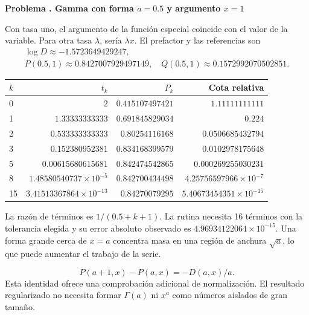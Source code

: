 \documentclass[11pt,a4paper]{article}
\theoremstyle{definition}
\newcounter{problema}
\newenvironment{resuelto}[1]{\refstepcounter{problema}\par\medskip\Needspace{6\baselineskip}\textbf{Problema \theproblema. #1}\par}{\par\medskip}
\begin{document}
\begin{resuelto}{Gamma con forma $a=0.5$ y argumento $x=1$}
Con tasa uno, el argumento de la función especial coincide con el valor de la variable. Para otra tasa $\lambda$, sería $\lambda x$. El prefactor y las referencias son
\[
\begin{gathered}
\log D\approx-1.5723649429247,\\
P(0.5,1)\approx0.8427007929497149,\quad Q(0.5,1)\approx0.1572992070502851.
\end{gathered}
\]

\begin{center}\small\begin{tabular}{lrrr}
\toprule
$k$ & $t_k$ & $P_k$ & Cota relativa\\\midrule
0 & $2$ & $0.415107497421$ & $1.11111111111$\\
1 & $1.33333333333$ & $0.691845829034$ & $0.224$\\
2 & $0.533333333333$ & $0.80254116168$ & $0.0506685432794$\\
3 & $0.152380952381$ & $0.834168399579$ & $0.0102978175648$\\
5 & $0.00615680615681$ & $0.842474542865$ & $0.000269255030231$\\
8 & $1.48580540737\times10^{-5}$ & $0.842700434498$ & $4.25756597966\times10^{-7}$\\
15 & $3.41513367864\times10^{-13}$ & $0.84270079295$ & $5.40673454351\times10^{-15}$\\
\bottomrule\end{tabular}\end{center}

La razón de términos es $1/(0.5+k+1)$. La rutina necesita 16 términos con la tolerancia elegida y su error absoluto observado es $4.96934122064\times10^{-15}$. Una forma grande cerca de $x=a$ concentra masa en una región de anchura $\sqrt a$, lo que puede aumentar el trabajo de la serie.

\[
P(a+1,x)-P(a,x)=-D(a,x)/a.
\]
Esta identidad ofrece una comprobación adicional de normalización. El resultado regularizado no necesita formar $\Gamma(a)$ ni $x^a$ como números aislados de gran tamaño.
\end{resuelto}
\end{document}
